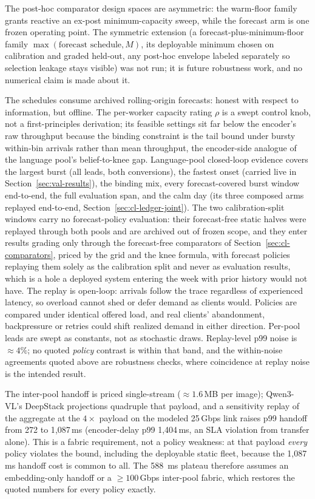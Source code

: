 The post-hoc comparator design spaces are asymmetric: the warm-floor family
grants reactive an ex-post minimum-capacity sweep, while the forecast arm is
one frozen operating point. The symmetric extension (a
forecast-plus-minimum-floor family $\max(\text{forecast schedule}, M)$, its
deployable minimum chosen on calibration and graded held-out, any post-hoc
envelope labeled separately so selection leakage stays visible) was not
run; it is future robustness work, and no numerical claim is made about it.

The schedules consume archived rolling-origin forecasts: honest with respect to
information, but offline. The per-worker capacity rating $\rho$ is a swept
control knob, not a first-principles derivation; its feasible settings sit far
below the encoder's raw throughput because the binding constraint is the tail
bound under bursty within-bin arrivals rather than mean throughput, the
encoder-side analogue of the language pool's belief-to-knee gap. Language-pool
closed-loop evidence covers the largest burst (all leads, both conversions),
the fastest onset (carried live in Section~\ref{sec:val-results}), the binding
mix, every forecast-covered burst window end-to-end, the full evaluation
span, and the calm day (its three composed arms replayed end-to-end,
Section~\ref{sec:cl-ledger-joint}). The two calibration-split windows carry no
forecast-policy evaluation: their forecast-free static halves were
replayed through both pools and are archived out of frozen scope, and they
enter results grading only through the forecast-free comparators of
Section~\ref{sec:cl-comparators}, priced by the grid and the
knee formula, with forecast policies replaying them solely as the calibration
split and never as evaluation results, which is a hole a deployed system
entering the week with prior history would not have. The replay is open-loop:
arrivals
follow the trace regardless of experienced latency, so overload cannot shed or
defer demand as clients would. Policies are compared under identical offered
load, and real clients' abandonment, backpressure or retries could shift
realized demand in either direction. Per-pool leads are swept as constants, not
as stochastic draws. Replay-level p99 noise is ${\approx}4\%$; no quoted
\emph{policy} contrast is within that band, and the within-noise agreements
quoted above are robustness checks, where coincidence at replay noise is the
intended result.

The inter-pool handoff is priced single-stream (${\approx}1.6$\,MB per image);
Qwen3-VL's DeepStack projections quadruple that payload, and a sensitivity
replay of the aggregate at the $4\times$ payload on the modeled 25\,Gbps link
raises p99 handoff from 272 to 1{,}087\,\si{\milli\second} (encoder-delay p99
1{,}404\,\si{\milli\second}, an SLA violation from transfer alone). This is
a fabric requirement, not a policy weakness: at that payload \emph{every}
policy violates the bound, including the deployable static fleet, because the
1{,}087\,\si{\milli\second} handoff cost is common to all. The
\SI{588}{\milli\second} plateau therefore assumes an embedding-only handoff or
a ${\geq}100$\,Gbps inter-pool fabric, which restores the quoted numbers for
every policy exactly.


